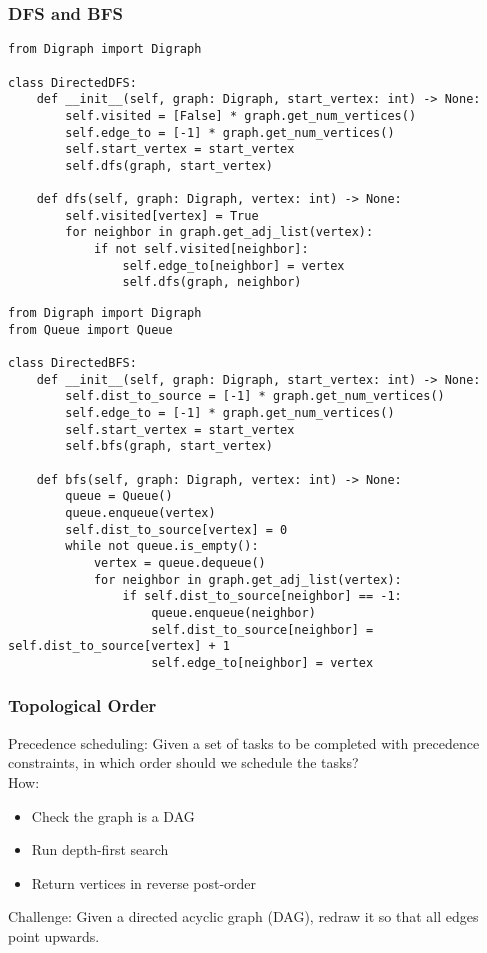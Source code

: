 \documentclass[a4paper]{article}
\begin{document}
\subsubsection*{DFS and BFS}
\begin{lstlisting}
from Digraph import Digraph

class DirectedDFS:
    def __init__(self, graph: Digraph, start_vertex: int) -> None:
        self.visited = [False] * graph.get_num_vertices()
        self.edge_to = [-1] * graph.get_num_vertices()
        self.start_vertex = start_vertex
        self.dfs(graph, start_vertex)

    def dfs(self, graph: Digraph, vertex: int) -> None:
        self.visited[vertex] = True
        for neighbor in graph.get_adj_list(vertex):
            if not self.visited[neighbor]:
                self.edge_to[neighbor] = vertex
                self.dfs(graph, neighbor)
\end{lstlisting}

\begin{lstlisting}
from Digraph import Digraph
from Queue import Queue

class DirectedBFS:
    def __init__(self, graph: Digraph, start_vertex: int) -> None:
        self.dist_to_source = [-1] * graph.get_num_vertices()
        self.edge_to = [-1] * graph.get_num_vertices()
        self.start_vertex = start_vertex
        self.bfs(graph, start_vertex)

    def bfs(self, graph: Digraph, vertex: int) -> None:
        queue = Queue()
        queue.enqueue(vertex)
        self.dist_to_source[vertex] = 0
        while not queue.is_empty():
            vertex = queue.dequeue()
            for neighbor in graph.get_adj_list(vertex):
                if self.dist_to_source[neighbor] == -1:
                    queue.enqueue(neighbor)
                    self.dist_to_source[neighbor] = self.dist_to_source[vertex] + 1
                    self.edge_to[neighbor] = vertex
\end{lstlisting}

\subsubsection*{Topological Order}
Precedence scheduling: Given a set of tasks to be completed with precedence constraints, in which order should we schedule the tasks?\\
How:
\begin{itemize}
    \item Check the graph is a DAG
    \item Run depth-first search
    \item Return vertices in reverse post-order
\end{itemize}
Challenge: Given a directed acyclic graph (DAG), redraw it so that all edges point upwards.
\end{document}
